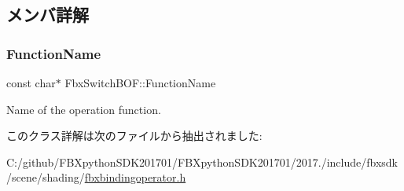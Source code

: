 \subsection{メンバ詳解}
\mbox{\label{class_fbx_switch_b_o_f_a5d39c1526096c35b43cb93759270df40}} 
\subsubsection{\texorpdfstring{Function\+Name}{FunctionName}}
{\footnotesize\ttfamily const char$\ast$ Fbx\+Switch\+B\+O\+F\+::\+Function\+Name\hspace{0.3cm}{\ttfamily [static]}}



Name of the operation function. 



このクラス詳解は次のファイルから抽出されました\+:\begin{DoxyCompactItemize}
\item 
C\+:/github/\+F\+B\+Xpython\+S\+D\+K201701/\+F\+B\+Xpython\+S\+D\+K201701/2017./include/fbxsdk/scene/shading/\hyperlink{fbxbindingoperator_8h}{fbxbindingoperator.\+h}\end{DoxyCompactItemize}
